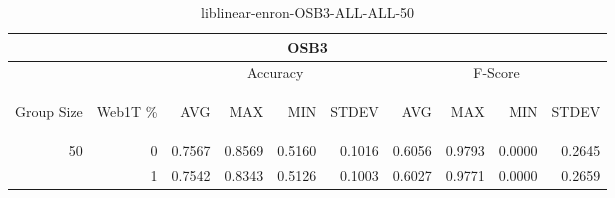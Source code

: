 \begin{center}
\begin{table}[htbp]
\begin{tabular}{ | r | r | r | r | r | r | r | r | r | r |}
\hline
\multicolumn{10}{|c|}{OSB3}\\
\hline
 & & \multicolumn{4}{|c|}{Accuracy} & \multicolumn{4}{|c|}{F-Score}\\ \cline{3-10}
\begin{sideways}Group Size\end{sideways} & \begin{sideways}Web1T \%\end{sideways} & \begin{sideways}AVG\end{sideways} & \begin{sideways}MAX\end{sideways} & \begin{sideways}MIN\end{sideways} & \begin{sideways}STDEV\end{sideways} & \begin{sideways}AVG\end{sideways} & \begin{sideways}MAX\end{sideways} & \begin{sideways}MIN\end{sideways} & \begin{sideways}STDEV\end{sideways}\\
\hline
\multirow{2}{*}{50}
 & 0 & 0.7567 & 0.8569 & 0.5160 & 0.1016 & 0.6056 & 0.9793 & 0.0000 & 0.2645\\ \cline{2-10}
 & 1 & 0.7542 & 0.8343 & 0.5126 & 0.1003 & 0.6027 & 0.9771 & 0.0000 & 0.2659\\ \cline{2-10}
\hline
\end{tabular}
\caption{liblinear-enron-OSB3-ALL-ALL-50}
\end{table}
\end{center}

